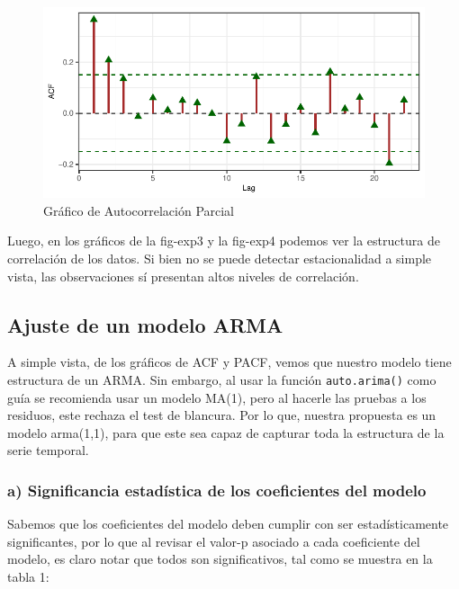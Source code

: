 \documentclass[
  letterpaper,
  DIV=11,
  numbers=noendperiod,
  twocolumn]{scrartcl}
\begin{document}
\begin{figure}[H]

{\centering \includegraphics{CopyOfpdf_tarea2_files/figure-pdf/fig-exp4-1.pdf}

}

\caption{\label{fig-exp4}Gráfico de Autocorrelación Parcial}

\end{figure}

Luego, en los gráficos de la fig-exp3 y la fig-exp4 podemos ver la
estructura de correlación de los datos. Si bien no se puede detectar
estacionalidad a simple vista, las observaciones sí presentan altos
niveles de correlación.

\hypertarget{ajuste-de-un-modelo-arma}{%
\subsection{Ajuste de un modelo ARMA}\label{ajuste-de-un-modelo-arma}}

A simple vista, de los gráficos de ACF y PACF, vemos que nuestro modelo
tiene estructura de un ARMA. Sin embargo, al usar la función
\texttt{auto.arima()} como guía se recomienda usar un modelo MA(1), pero
al hacerle las pruebas a los residuos, este rechaza el test de blancura.
Por lo que, nuestra propuesta es un modelo arma(1,1), para que este sea
capaz de capturar toda la estructura de la serie temporal.

\hypertarget{a-significancia-estaduxedstica-de-los-coeficientes-del-modelo}{%
\subsubsection{a) Significancia estadística de los coeficientes del
modelo}\label{a-significancia-estaduxedstica-de-los-coeficientes-del-modelo}}

Sabemos que los coeficientes del modelo deben cumplir con ser
estadísticamente significantes, por lo que al revisar el valor-p
asociado a cada coeficiente del modelo, es claro notar que todos son
significativos, tal como se muestra en la tabla 1:
\end{document}
